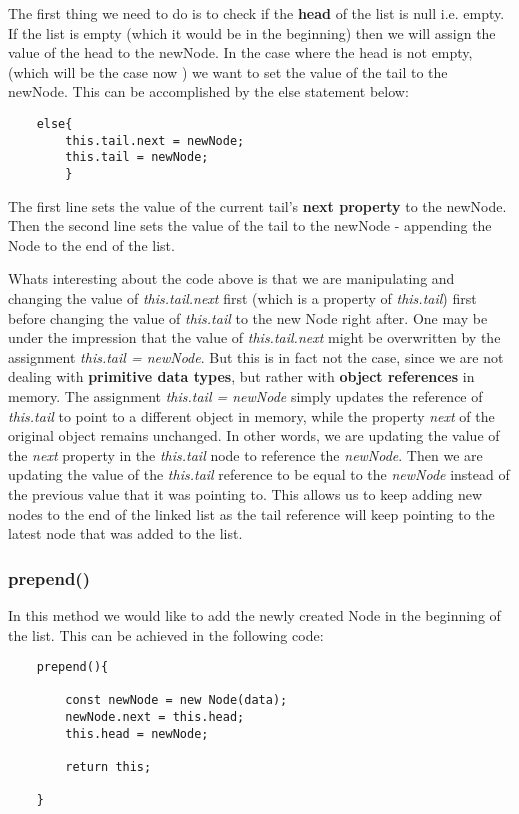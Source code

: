 \documentclass{article}
\begin{document}
The first thing we need to do is to check if the \textbf{head} of the list is null i.e. empty. If the list is empty (which it would be in the beginning) then we will assign the value of the head to the newNode.
In the case where the head is not empty, (which will be the case now ) we want to set the value of the tail to the newNode. This can be accomplished by the else statement below:

\begin{verbatim}
    else{
        this.tail.next = newNode;
        this.tail = newNode;
        }
\end{verbatim}

The first line sets the value of the current tail's \textbf{next property} to the newNode. Then the second line sets the value of the tail to the newNode - appending the Node to the end of the list.

Whats interesting about the code above is that we are manipulating and changing the value of \textit{this.tail.next} first (which is a property of \textit{this.tail}) first before changing the value of \textit{this.tail} to the new Node right after. 
One may be under the impression that the value of \textit{this.tail.next} might be overwritten by the assignment \textit{this.tail = newNode}. But this is in fact not the case, since we are not dealing with \textbf{primitive data types}, but rather with \textbf{object references} in memory. 
The assignment \textit{this.tail = newNode} simply updates the reference of \textit{this.tail} to point to a different object in memory, while the property \textit{next} of the original object remains unchanged.
In other words, we are updating the value of the \textit{next} property in the \textit{this.tail} node to reference the \textit{newNode}. Then we are updating the value of the \textit{this.tail} reference to be equal to the \textit{newNode} instead of the previous value that it was pointing to. This allows us to keep adding new nodes to the end of the linked list as the tail reference will keep pointing to the latest node that was added to the list.

\subsubsection{prepend()}

In this method we would like to add the newly created Node in the beginning of the list. This can be achieved in the following code:

\begin{verbatim}
    prepend(){
    
        const newNode = new Node(data);
        newNode.next = this.head;
        this.head = newNode;

        return this;

    }

\end{verbatim}
\end{document}
